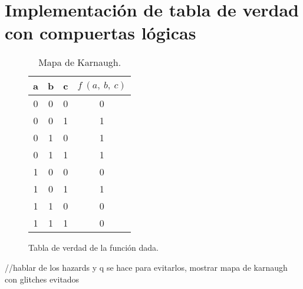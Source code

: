 \section{Implementación de tabla de verdad con compuertas lógicas}

\begin{table}[!htb]
	\vspace{5mm} %
	\begin{minipage}{.45\linewidth}
        \begin{figure}[H]
            \begin{center}
			\begin{tabular}{c|c|c|c}
                a& b & c & $f~(a,~b,~c)$ \\\hline
                0& 0 & 0 & 0 \\
                0& 0 & 1 & 1 \\
                0& 1 & 0 & 1 \\
                0& 1 & 1 & 1 \\
                1& 0 & 0 & 0 \\
                1& 0 & 1 & 1 \\
                1& 1 & 0 & 0 \\
                1& 1 & 1 & 0 
               \end{tabular}
            \end{center}
            \caption{Tabla de verdad de la función dada.}
		\end{figure}
	\end{minipage}%
	\begin{minipage}{.45\linewidth}
		\begin{figure}[H]
			\begin{center}
                \begin{Karnaughvuit}
				\end{Karnaughvuit}
				\label{table:mapaKarnaugh}
			\end{center}
        \end{figure}
        \caption{Mapa de Karnaugh.}
	\end{minipage} 
\end{table}

//hablar de los hazards y q se hace para evitarlos, mostrar mapa de karnaugh con glitches evitados

